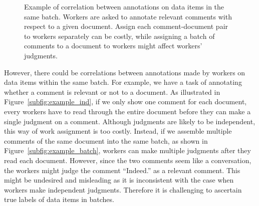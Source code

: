 {\begin{figure}[!t]
{  }
  \caption{\label{fig:example}
  Example of correlation between annotations on data items in the same batch.
  Workers are asked to annotate relevant comments with respect to a given document.
  Assign each comment-document pair to workers separately can be costly,
  while assigning a batch of comments to a document to workers might affect workers' judgments.
  }
\end{figure}
}


However, there could be correlations between annotations made by workers on data items within the same batch.
For example, we have a task of annotating whether a comment is relevant or not to a document.
As illustrated in Figure~\ref{subfig:example_ind}, if we only show one comment for each document,
every workers have to read through the entire document before they can make a single judgment on a comment.
Although judgments are likely to be independent, this way of work assignment is too costly.
Instead, if we assemble multiple comments of the same document into the same batch, as shown in Figure~\ref{subfig:example_batch},
workers can make multiple judgments after they read each document.
However, since the two comments seem like a conversation,
the workers might judge the comment ``Indeed.'' as a relevant comment.
This might be undesired and misleading as it is inconsistent with the case when workers make independent judgments.
Therefore it is challenging to ascertain true labels of data items in batches.





